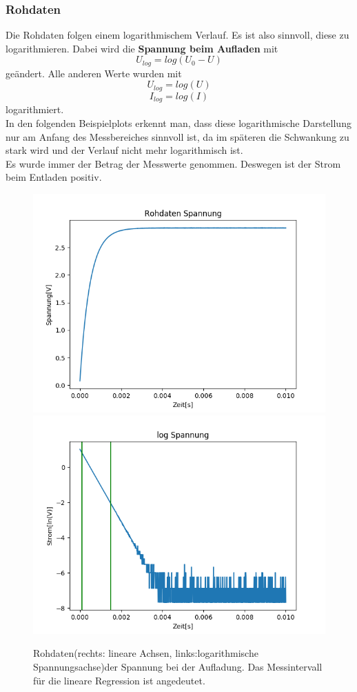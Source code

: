 \documentclass[12pt,a4paper]{article}
\begin{document}
\subsubsection{Rohdaten}
Die Rohdaten folgen einem logarithmischem Verlauf. Es ist also sinnvoll, diese zu logarithmieren. Dabei wird die \textbf{Spannung beim Aufladen} mit
\begin{equation}
U_{log} = log(U_0-U)
\end{equation}
geändert. Alle anderen Werte wurden mit
\begin{equation}
U_{log} = log(U)
\end{equation}
\begin{equation}
I_{log} = log(I)
\end{equation}
logarithmiert.\\
In den folgenden Beispielplots erkennt man, dass diese logarithmische Darstellung nur am Anfang des Messbereiches sinnvoll ist, da im späteren die Schwankung zu stark wird und der Verlauf nicht mehr logarithmisch ist.\\
Es wurde immer der Betrag der Messwerte genommen. Deswegen ist der Strom beim Entladen positiv.
\begin{figure}[H]
\begin{center}
\includegraphics[width=0.49\linewidth]{Bilder/Kondensator_U}
\includegraphics[width=0.49\linewidth]{Bilder/Kondensator_logU}
\caption[Rohdaten logarith. A]{Rohdaten(rechts: lineare Achsen, links:logarithmische Spannungsachse)der Spannung bei der Aufladung. Das Messintervall für die lineare Regression ist angedeutet.}
\label{fig:RohU}
\end{center}
\end{figure}
\end{document}
